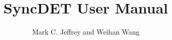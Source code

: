 \documentclass{article}
\begin{document}
\title{SyncDET User Manual}
\author{Mark C. Jeffrey and Weihan Wang}
\date{}

\maketitle
\tableofcontents





\end{document}
